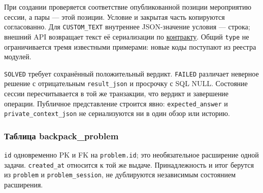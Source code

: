 \documentclass[12pt,a4paper]{article}
\begin{document}
При создании проверяется соответствие опубликованной позиции мероприятию сессии, а пары --- этой позиции. Условие и закрытая часть копируются согласованно. Для \texttt{CUSTOM\_\allowbreak{}TEXT} внутреннее JSON-значение условия --- строка; внешний API возвращает текст её сериализации по {\href{DOC-06.2\_Сессии\_задач\_и\_планировщик.pdf\#пользовательское-текстовое-задание}{контракту}}. Общий \texttt{type} не ограничивается тремя известными примерами: новые коды поступают из реестра модулей.

\texttt{SOLVED} требует сохранённый положительный вердикт. \texttt{FAILED} различает неверное решение с отрицательным \texttt{result\_\allowbreak{}json} и просрочку с SQL NULL. Состояние сессии пересчитывается в той же транзакции, что вердикт и завершение операции. Публичное представление строится явно: \texttt{expected\_\allowbreak{}answer} и \texttt{private\_\allowbreak{}context\_\allowbreak{}json} не сериализуются ни в один обзор или историю.

\subsubsection{Таблица backpack\_problem}\label{ux442ux430ux431ux43bux438ux446ux430-backpack_problem}

\hypertarget{таблица-backpack_problem}{}

\texttt{id} одновременно PK и FK на \texttt{problem.id}; это необязательное расширение одной задачи. \texttt{created\_at} относится к той же выдаче. Принадлежность и итог берутся из \texttt{problem} и \texttt{problem\_\allowbreak{}session}, не дублируются независимым состоянием расширения.
\end{document}
